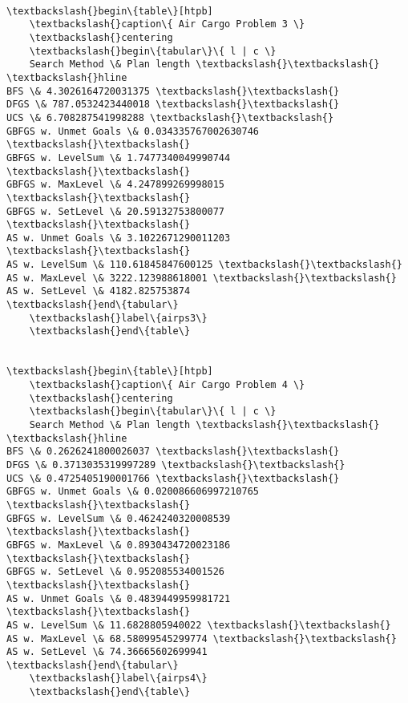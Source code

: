 \documentclass[11pt]{article}
\begin{document}
\begin{Verbatim}[commandchars=\\\{\}]
    
\textbackslash{}begin\{table\}[htpb]
    \textbackslash{}caption\{ Air Cargo Problem 3 \}
    \textbackslash{}centering
    \textbackslash{}begin\{tabular\}\{ l | c \}
    Search Method \& Plan length \textbackslash{}\textbackslash{} \textbackslash{}hline 
BFS \& 4.3026164720031375 \textbackslash{}\textbackslash{}
DFGS \& 787.0532423440018 \textbackslash{}\textbackslash{}
UCS \& 6.708287541998288 \textbackslash{}\textbackslash{}
GBFGS w. Unmet Goals \& 0.034335767002630746 \textbackslash{}\textbackslash{}
GBFGS w. LevelSum \& 1.7477340049990744 \textbackslash{}\textbackslash{}
GBFGS w. MaxLevel \& 4.247899269998015 \textbackslash{}\textbackslash{}
GBFGS w. SetLevel \& 20.59132753800077 \textbackslash{}\textbackslash{}
AS w. Unmet Goals \& 3.1022671290011203 \textbackslash{}\textbackslash{}
AS w. LevelSum \& 110.61845847600125 \textbackslash{}\textbackslash{}
AS w. MaxLevel \& 3222.123988618001 \textbackslash{}\textbackslash{}
AS w. SetLevel \& 4182.825753874
\textbackslash{}end\{tabular\}
    \textbackslash{}label\{airps3\}
    \textbackslash{}end\{table\}

    
\textbackslash{}begin\{table\}[htpb]
    \textbackslash{}caption\{ Air Cargo Problem 4 \}
    \textbackslash{}centering
    \textbackslash{}begin\{tabular\}\{ l | c \}
    Search Method \& Plan length \textbackslash{}\textbackslash{} \textbackslash{}hline 
BFS \& 0.2626241800026037 \textbackslash{}\textbackslash{}
DFGS \& 0.3713035319997289 \textbackslash{}\textbackslash{}
UCS \& 0.4725405190001766 \textbackslash{}\textbackslash{}
GBFGS w. Unmet Goals \& 0.020086606997210765 \textbackslash{}\textbackslash{}
GBFGS w. LevelSum \& 0.4624240320008539 \textbackslash{}\textbackslash{}
GBFGS w. MaxLevel \& 0.8930434720023186 \textbackslash{}\textbackslash{}
GBFGS w. SetLevel \& 0.952085534001526 \textbackslash{}\textbackslash{}
AS w. Unmet Goals \& 0.4839449959981721 \textbackslash{}\textbackslash{}
AS w. LevelSum \& 11.6828805940022 \textbackslash{}\textbackslash{}
AS w. MaxLevel \& 68.58099545299774 \textbackslash{}\textbackslash{}
AS w. SetLevel \& 74.36665602699941
\textbackslash{}end\{tabular\}
    \textbackslash{}label\{airps4\}
    \textbackslash{}end\{table\}

    

    \end{Verbatim}


    
    
    
    
\end{document}
